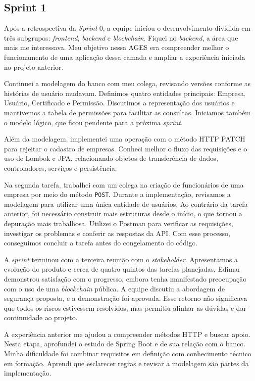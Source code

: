 \clearpage
\subsection{Sprint 1}

Após a retrospectiva da \textit{Sprint} 0, a equipe iniciou o desenvolvimento dividida em três subgrupos: \textit{frontend}, \textit{backend} e \textit{blockchain}. Fiquei no \textit{backend}, a área que mais me interessava. Meu objetivo nessa \ac{AGES} era compreender melhor o funcionamento de uma aplicação dessa camada e ampliar a experiência iniciada no projeto anterior.

Continuei a modelagem do banco com meu colega, revisando versões conforme as histórias de usuário mudavam. Definimos quatro entidades principais: Empresa, Usuário, Certificado e Permissão. Discutimos a representação dos usuários e mantivemos a tabela de permissões para facilitar as consultas. Iniciamos também o modelo lógico, que ficou pendente para a próxima \textit{sprint}.

Além da modelagem, implementei uma operação com o método \ac{HTTP} PATCH para rejeitar o cadastro de empresas. Conheci melhor o fluxo das requisições e o uso de Lombok e \ac{JPA}, relacionando objetos de transferência de dados, controladores, serviços e persistência.

Na segunda tarefa, trabalhei com um colega na criação de funcionários de uma empresa por meio do método \texttt{POST}. Durante a implementação, revisamos a modelagem para utilizar uma única entidade de usuários. Ao contrário da tarefa anterior, foi necessário construir mais estruturas desde o início, o que tornou a depuração mais trabalhosa. Utilizei o Postman para verificar as requisições, investigar os problemas e conferir as respostas da \ac{API}. Com esse processo, conseguimos concluir a tarefa antes do congelamento do código.

A \textit{sprint} terminou com a terceira reunião com o \textit{stakeholder}. Apresentamos a evolução do produto e cerca de quatro quintos das tarefas planejadas. Edimar demonstrou satisfação com o progresso, embora tenha manifestado preocupação com o uso de uma \textit{blockchain} pública. A equipe discutiu a abordagem de segurança proposta, e a demonstração foi aprovada. Esse retorno não significava que todos os riscos estivessem resolvidos, mas permitiu alinhar as dúvidas e dar continuidade ao projeto.

A experiência anterior me ajudou a compreender métodos \ac{HTTP} e buscar apoio. Nesta etapa, aprofundei o estudo de Spring Boot e de sua relação com o banco. Minha dificuldade foi combinar requisitos em definição com conhecimento técnico em formação. Aprendi que esclarecer regras e revisar a modelagem são partes da implementação.
